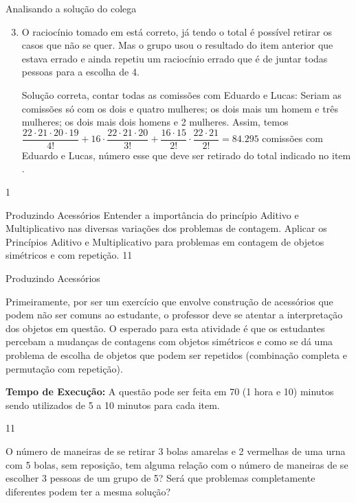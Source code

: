 \begin{answer}{Analisando a solução do colega}
{
\begin{enumerate}\setcounter{enumi}{2}
\item O raciocínio tomado em  está correto, já tendo o total é possível retirar os casos que não se quer. Mas o grupo usou o resultado do item anterior que estava errado e ainda repetiu um raciocínio errado que é de juntar todas pessoas para a escolha de 4. 

Solução correta, contar todas as comissões com Eduardo e Lucas: Seriam as comissões só com os dois e quatro mulheres; os dois mais um homem e três mulheres; os dois mais dois homens e 2 mulheres. Assim, temos
$\dfrac{22 \cdot 21 \cdot 20\cdot 19}{4!}+16 \cdot \dfrac{22 \cdot 21 \cdot 20}{3!}+\dfrac{16 \cdot 15}{2!}\cdot \dfrac{22 \cdot 21}{2!} = 84.295$ comissões com Eduardo e Lucas, número esse que deve ser retirado do total indicado no item .
\end{enumerate}
}{1}
\end{answer}
\begin{objectives}{Produzindo Acessórios}
{
Entender a importância do princípio Aditivo e Multiplicativo nas diversas variações dos problemas de contagem. Aplicar os Princípios Aditivo e Multiplicativo para problemas em contagem de objetos simétricos e com repetição.
}{1}{1}
\end{objectives}

\begin{sugestions}{Produzindo Acessórios}
{
Primeiramente, por ser um exercício que envolve construção de acessórios que podem não ser comuns ao estudante, o professor deve se atentar a interpretação dos objetos em questão. O esperado para esta atividade é que os estudantes percebam a mudanças de contagens com objetos simétricos e como se dá uma problema de escolha de objetos que podem ser repetidos (combinação completa e permutação com repetição).

\textbf{Tempo de Execução:} A questão pode ser feita em 70 (1 hora e 10) minutos sendo utilizados de 5 a 10 minutos para cada item.
}{1}{1}
\end{sugestions}


O número de maneiras de se retirar 3 bolas amarelas e 2 vermelhas de uma urna com 5 bolas, sem reposição, tem alguma relação com o número de maneiras de se escolher 3 pessoas de um grupo de 5? Será que problemas completamente diferentes podem ter a mesma solução?

